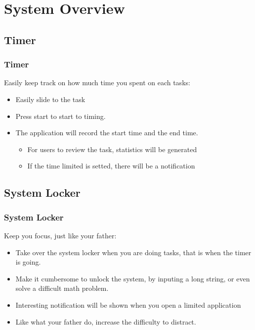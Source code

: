 \documentclass{beamer}
\begin{document}
\section{System Overview}
\subsection{Timer}
\begin{frame}\frametitle{Timer}
Easily keep track on how much time you spent on each tasks:
\begin{itemize}
\item Easily slide to the task
\item Press start to start to timing.
\item The application will record the start time and the end time.
  \begin{itemize}
    \item For users to review the task, statistics will be generated
    \item If the time limited is setted, there will be a notification 
  \end{itemize}
\end{itemize}
\end{frame}

\subsection{System Locker}
\begin{frame}\frametitle{System Locker}
Keep you focus, just like your father:
\begin{itemize}
\item Take over the system locker when you are doing tasks, that is when the timer is going.
\item Make it cumbersome to unlock the system, by inputing a long string, or
even solve a difficult math problem. 
\item Interesting notification will be shown when you open a limited application
\item Like what your father do, increase the difficulty to distract.
\end{itemize}
\end{frame}
\end{document}
